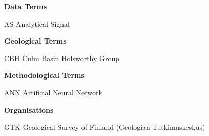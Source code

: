 \begin{abbreviations}
	\item[\textbf{Data Terms \hfill\hfill}]
		\item[AS] Analytical Signal
		\\
	\item[\textbf{Geological Terms}]
		\item[CBH] Culm Basin Holsworthy Group
		\\
	\item[\textbf{Methodological Terms}]
		\item[ANN] Artificial Neural Network
		\\
	\item[\textbf{Organisations\hfill\hfill\hfill}]
		\item[GTK] Geological Survey of Finland (Geologian Tutkimuskeskus)
\end{abbreviations}